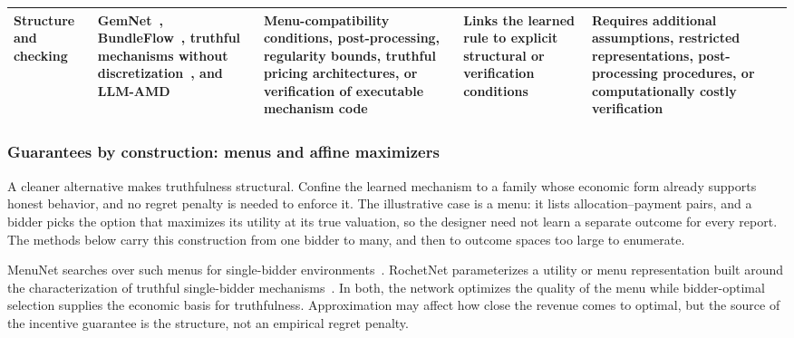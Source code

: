 \begin{table}[pos=t]
\begin{tabularx}{\textwidth}{
    >{\raggedright\arraybackslash}p{}
    >{\raggedright\arraybackslash}p{}
    Y
    Y
    Y
}
\addlinespace

Structure and checking
&
GemNet~\citep{Duetting2024}, BundleFlow~\citep{WangBundleFlow2025}, truthful mechanisms without discretization~\citep{TEDI2025}, and LLM-AMD~\citep{LiuGuoConitzer2025}
&
Menu-compatibility conditions, post-processing, regularity bounds, truthful pricing architectures, or verification of executable mechanism code
&
Links the learned rule to explicit structural or verification conditions
&
Requires additional assumptions, restricted representations, post-processing procedures, or computationally costly verification
\\

\bottomrule
\end{tabularx}
\end{table}

\subsubsection{Guarantees by construction: menus and affine maximizers}

A cleaner alternative makes truthfulness structural. Confine the learned mechanism
to a family whose economic form already supports honest behavior, and no regret
penalty is needed to enforce it. The illustrative case is a menu: it lists
allocation--payment pairs, and a bidder picks the option that maximizes its utility
at its true valuation, so the designer need not learn a separate outcome for every
report. The methods below carry this construction from one bidder to many, and then
to outcome spaces too large to enumerate.

 MenuNet searches over such menus for single-bidder
environments~\citep{Shen2019}. RochetNet parameterizes a utility or menu
representation built around the characterization of truthful single-bidder
mechanisms~\citep{Duetting2019}. In both, the network optimizes the quality of the
menu while bidder-optimal selection supplies the economic basis for truthfulness.
Approximation may affect how close the revenue comes to optimal, but the source of
the incentive guarantee is the structure, not an empirical regret penalty.
\FloatBarrier


